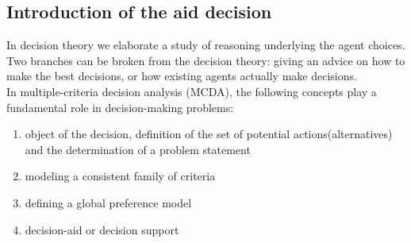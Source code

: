 \documentclass{report}
\begin{document}
\subsection{Introduction of the aid decision}
In decision theory we elaborate a study of reasoning underlying the agent choices. Two branches can be broken from the decision theory: giving an advice on how to make the best decisions, or how existing agents actually make decisions. \\
In multiple-criteria decision analysis (MCDA), the following concepts play a fundamental role in decision-making problems: 
\begin{enumerate}
\item object of the decision, definition of the set of potential actions(alternatives) and the determination of a problem statement
\item modeling a consistent family of criteria
\item defining a global preference model
\item decision-aid or decision support
\end{enumerate}
\end{document}
